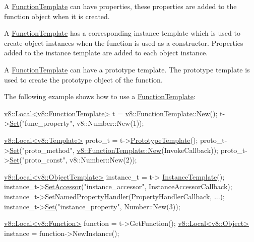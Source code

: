 A \hyperlink{classv8_1_1FunctionTemplate}{Function\+Template} can have properties, these properties are added to the function object when it is created.

A \hyperlink{classv8_1_1FunctionTemplate}{Function\+Template} has a corresponding instance template which is used to create object instances when the function is used as a constructor. Properties added to the instance template are added to each object instance.

A \hyperlink{classv8_1_1FunctionTemplate}{Function\+Template} can have a prototype template. The prototype template is used to create the prototype object of the function.

The following example shows how to use a \hyperlink{classv8_1_1FunctionTemplate}{Function\+Template}\+:


\begin{DoxyCode}
\hyperlink{classv8_1_1Local}{v8::Local<v8::FunctionTemplate>} t = 
      \hyperlink{classv8_1_1FunctionTemplate_a3c6a525ee4e0d72afa77be8e34861f83}{v8::FunctionTemplate::New}();
t->\hyperlink{classv8_1_1Template_a623b9f0cdd87dc861516f276cc9a7cfa}{Set}(\textcolor{stringliteral}{"func\_property"}, v8::Number::New(1));

\hyperlink{classv8_1_1Local}{v8::Local<v8::Template>} proto\_t = t->\hyperlink{classv8_1_1FunctionTemplate_aa2bcc2652b5f0fdbc666d943ccf72021}{PrototypeTemplate}();
proto\_t->\hyperlink{classv8_1_1Template_a623b9f0cdd87dc861516f276cc9a7cfa}{Set}(\textcolor{stringliteral}{"proto\_method"}, \hyperlink{classv8_1_1FunctionTemplate_a3c6a525ee4e0d72afa77be8e34861f83}{v8::FunctionTemplate::New}(InvokeCallback));
proto\_t->\hyperlink{classv8_1_1Template_a623b9f0cdd87dc861516f276cc9a7cfa}{Set}(\textcolor{stringliteral}{"proto\_const"}, v8::Number::New(2));

\hyperlink{classv8_1_1Local}{v8::Local<v8::ObjectTemplate>} instance\_t = t->
      \hyperlink{classv8_1_1FunctionTemplate_a00dd9725566908e8fd14064542f5a781}{InstanceTemplate}();
instance\_t->\hyperlink{classv8_1_1ObjectTemplate_a7300126e15ff8246813e07f92d4fbe83}{SetAccessor}(\textcolor{stringliteral}{"instance\_accessor"}, InstanceAccessorCallback);
instance\_t->\hyperlink{classv8_1_1ObjectTemplate_a66fa7b04c87676e20e35497ea09a0ad0}{SetNamedPropertyHandler}(PropertyHandlerCallback, ...);
instance\_t->\hyperlink{classv8_1_1Template_a623b9f0cdd87dc861516f276cc9a7cfa}{Set}(\textcolor{stringliteral}{"instance\_property"}, Number::New(3));

\hyperlink{classv8_1_1Local}{v8::Local<v8::Function>} \textcolor{keyword}{function} = t->GetFunction();
\hyperlink{classv8_1_1Local}{v8::Local<v8::Object>} instance = \textcolor{keyword}{function}->NewInstance();
\end{DoxyCode}


